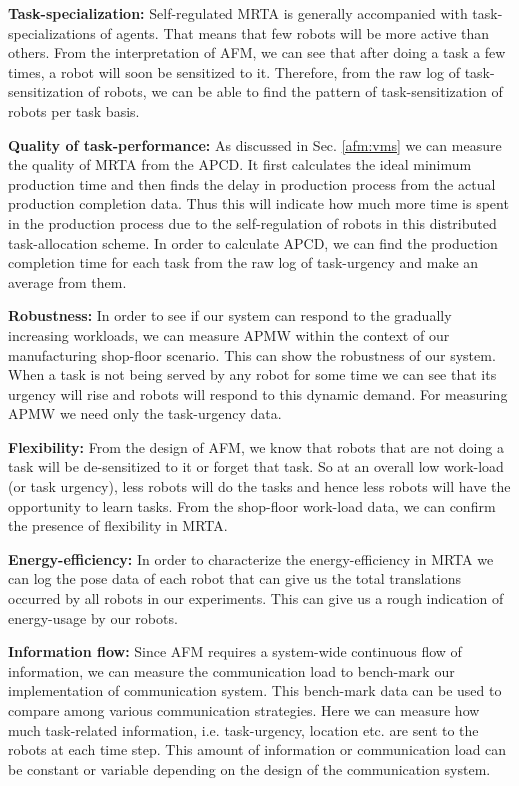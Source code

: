 \documentclass[final,5p,times,twocolumn]{elsarticle}
\begin{document}
\textbf{Task-specialization:} Self-regulated MRTA is generally accompanied with task-specializations of agents. That means that few robots will be more active than others. From the interpretation of AFM, we can see that after doing a task a few times, a robot will soon be sensitized to it. Therefore, from the raw log of task-sensitization of robots, we can be able to find the pattern of task-sensitization of robots per task basis.

\textbf{Quality of task-performance:} As discussed in Sec. \ref{afm:vms} we can measure the quality of MRTA from the APCD. It first calculates the ideal minimum production time and then finds the delay in production process from the actual production completion data. Thus this will indicate how much more time is  spent in the production process due to the self-regulation of robots in this distributed task-allocation scheme.  In order to calculate APCD, we can find the production completion time for each task from the raw log of task-urgency and make an average from them.

\textbf{Robustness:} In order to see if our system can respond to the gradually increasing workloads,  we can measure APMW within the context of our manufacturing shop-floor scenario. This can show the robustness of our system. When a task is not being served by any robot for some time we can see that its urgency will rise and robots will respond to this dynamic demand. For measuring APMW we need only the task-urgency data.

\textbf{Flexibility:} From the design of AFM, we know that robots that are not doing a task will be de-sensitized to it or forget that task. So at an overall low work-load (or task urgency), less robots will do the tasks and hence less robots will have the opportunity to learn tasks. From the shop-floor work-load data, we can confirm the presence of flexibility in MRTA.

\textbf{Energy-efficiency:} In order to characterize the energy-efficiency in MRTA we can log the pose data of each robot that can give us the total translations occurred by all robots in our experiments. This can give us a rough indication of energy-usage by our robots. 

\textbf{Information flow:} Since AFM requires a system-wide continuous flow of information, we can measure the communication load to bench-mark our implementation of communication system. This bench-mark data can be used to compare among various communication strategies. Here we can measure  how much task-related information, i.e. task-urgency, location etc. are sent to the robots at each time step. This  amount of information or communication load can be constant or variable depending on the design of the communication system.
\end{document}
